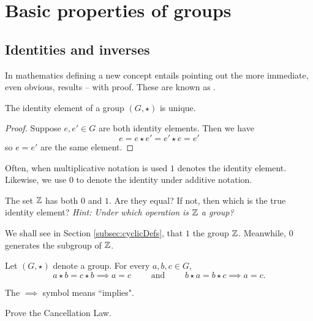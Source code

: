 \documentclass[../algebraNotesMSRI-UP2016.tex]{subfiles}
\begin{document}
\section[\S \thesection]{Basic properties of groups}
\subsection[\subsecname]{Identities and inverses}\label{subsec:identitiesInverses}
\begin{frame}{\subsecname}
In mathematics defining a new concept entails pointing out the more immediate, even obvious, results -- with proof.  These are known as .

\smallGap
\begin{prop}
The identity element of a group $(G,\star)$ is unique.
\end{prop}

\smallGap
\begin{proof}
Suppose $e,e'\in G$ are both identity elements.  Then we have 
\[
e=e\star e'=e'\star e=e'
\] 
so $e=e'$ are the same element.
\end{proof}
\end{frame}

\begin{frame}[c]
Often, when multiplicative notation is used $1$ denotes the identity element.  Likewise, we use $0$ to denote the identity under additive notation.  

\smallGap
\begin{que} The set $\mathbb Z$ has both $0$ and $1$.  Are they equal?  If not, then which is the true identity element?  \textit{Hint: Under which operation is $\mathbb Z$ a group?}
\end{que}

\smallGap
We shall see in Section \ref{subsec:cyclicDefs}, that $1$  the group $\mathbb Z$.  Meanwhile, $0$ generates the  subgroup of $\mathbb Z$.
\end{frame}

\begin{frame}[c]
\begin{prop}
Let $(G,\star)$ denote a group.  For every $a,b,c\in G$, 
\[
a\star b=c\star b\implies a=c\qquad\text{ and }\qquad b\star a=b\star c\implies a=c.
\]
\end{prop}

\smallGap
The $\implies$ symbol means ``implies".


\smallGap
\begin{exe}\label{exe:cancellationLaw}
Prove the Cancellation Law.
\end{exe}
\end{frame}
\end{document}
